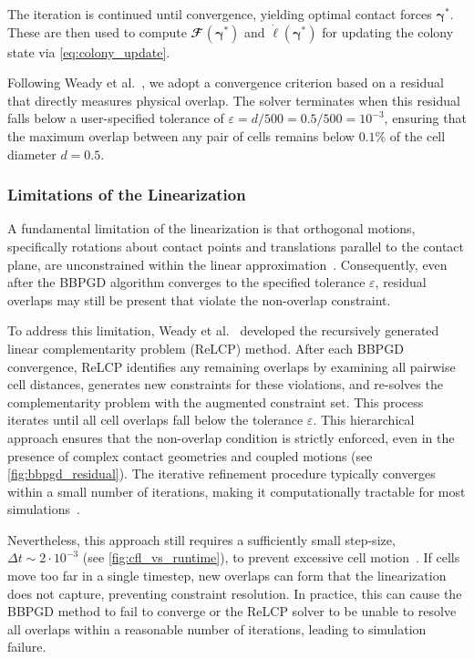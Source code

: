 \documentclass[a4paper,fleqn]{cas-dc}
\begin{document}
The iteration is continued until convergence, yielding optimal contact forces $\boldsymbol{\gamma}^*$. These are then used to compute $\mathbfcal{F}(\boldsymbol{\gamma}^*)$ and $\dot{\boldsymbol{\ell}}(\boldsymbol{\gamma}^*)$ for updating the colony state via \autoref{eq:colony_update}.

Following Weady et al.~\cite{Weady2024SM}, we adopt a convergence criterion based on a residual that directly measures physical overlap. The solver terminates when this residual falls below a user-specified tolerance of $\varepsilon = d/500 = 0.5/500 = 10^{-3}$, ensuring that the maximum overlap between any pair of cells remains below $0.1\%$ of the cell diameter $d = 0.5$.

\subsubsection{Limitations of the Linearization}

A fundamental limitation of the linearization is that orthogonal motions, specifically rotations about contact points and translations parallel to the contact plane, are unconstrained within the linear approximation~\cite{Weady2024SM}. Consequently, even after the BBPGD algorithm converges to the specified tolerance $\varepsilon$, residual overlaps may still be present that violate the non-overlap constraint.

To address this limitation, Weady et al.~\cite{Weady2024SM} developed the recursively generated linear complementarity problem (ReLCP) method. After each BBPGD convergence, ReLCP identifies any remaining overlaps by examining all pairwise cell distances, generates new constraints for these violations, and re-solves the complementarity problem with the augmented constraint set. This process iterates until all cell overlaps fall below the tolerance $\varepsilon$. This hierarchical approach ensures that the non-overlap condition is strictly enforced, even in the presence of complex contact geometries and coupled motions (see \autoref{fig:bbpgd_residual}). The iterative refinement procedure typically converges within a small number of iterations, making it computationally tractable for most simulations~\cite{Weady2024SM}.

Nevertheless, this approach still requires a sufficiently small step-size, $\Delta t \sim 2 \cdot 10^{-3}$ (see \autoref{fig:cfl_vs_runtime}), to prevent excessive cell motion~\cite{Yan2022}. If cells move too far in a single timestep, new overlaps can form that the linearization does not capture, preventing constraint resolution. In practice, this can cause the BBPGD method to fail to converge or the ReLCP solver to be unable to resolve all overlaps within a reasonable number of iterations, leading to simulation failure.
\end{document}
